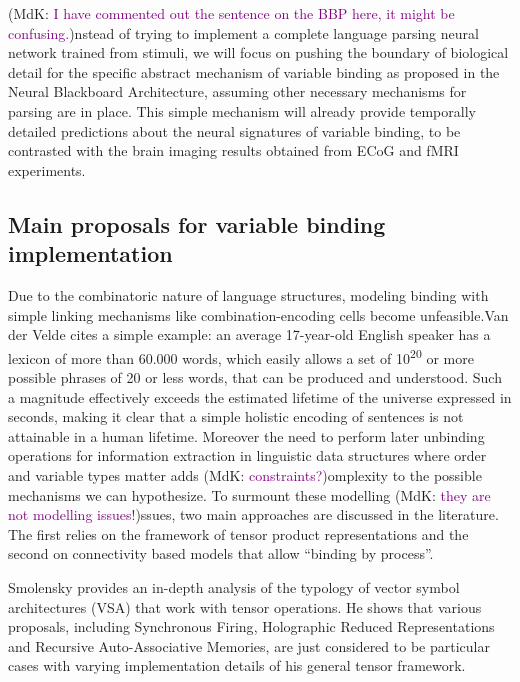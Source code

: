 \documentclass[10pt]{article}
\newcommand{\notenewMdK}[2]{(MdK: \textcolor{purple}{#1})}
\begin{document}
\notenewMdK{I have commented out the sentence on the BBP here, it might  be confusing.}
Instead of trying to implement a complete language parsing neural network trained from stimuli, we will focus on pushing the boundary of biological detail for the specific abstract mechanism of variable binding as proposed in the Neural Blackboard Architecture\cite{van_der_Velde_2006}, assuming other necessary mechanisms for parsing are in place.
This simple mechanism will already provide temporally detailed predictions about the neural signatures of variable binding, to be contrasted with the brain imaging results obtained from ECoG and fMRI experiments.

\subsection{Main proposals for variable binding implementation}

{\label{946708}}

Due to the combinatoric nature of language structures, modeling binding with simple linking mechanisms like combination-encoding cells 
become unfeasible\cite{von_der_Malsburg_1999}.Van der Velde\cite{van_der_Velde_2006} cites a simple example: an average 17-year-old English speaker has a lexicon of more than 
60.000 words, which easily allows a set of 10\textsuperscript{20} or more possible phrases of 20 or less words, that can be produced and understood.
Such a magnitude effectively exceeds the estimated lifetime of the universe expressed in seconds, 
making it clear that a simple holistic encoding of sentences is not attainable in a human lifetime.
Moreover the need to perform later unbinding operations for information extraction in linguistic data structures where order and variable types matter 
adds \notenewMdK{constraints?} complexity to the possible mechanisms we can hypothesize.
To surmount these modelling \notenewMdK{they are not modelling issues!}  issues, two main approaches are discussed in the literature.
The first relies on the framework of tensor product representations\cite{smolensky2006harmonic} and 
the second on connectivity based models that allow ``binding by process''\cite{van_der_Velde_2015}.

Smolensky provides an in-depth analysis of the typology of vector symbol architectures (VSA) that work with tensor operations.
He shows that various proposals, including Synchronous Firing\cite{Shastri_1993}, Holographic Reduced Representations\cite{Plate_1995} and Recursive Auto-Associative Memories\cite{Chalmers_1992}, are just considered to be particular cases with varying implementation details of his general tensor framework.
\end{document}
